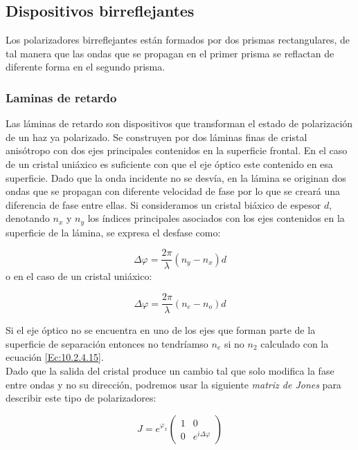 \documentclass[12pt,a4paper]{article}
\numberwithin{equation}{section}
\numberwithin{figure}{section}
\begin{document}
\subsection{Dispositivos birreflejantes}

Los polarizadores birreflejantes están formados por dos prismas rectangulares, de tal manera que las ondas que se propagan en el primer prisma se reflactan de diferente forma en el segundo prisma.

\subsubsection{Laminas de retardo}

Las láminas de retardo son dispositivos que transforman el estado de polarización de un haz ya polarizado. Se construyen por dos láminas finas de cristal anisótropo con dos ejes principales contenidos en la superficie frontal. En el caso de un cristal uniáxico es suficiente con que el eje óptico este contenido en esa superficie. Dado que la onda incidente no se desvía, en la lámina se originan dos ondas que se propagan con diferente velocidad de fase por lo que se creará una diferencia de fase entre ellas. Si consideramos un cristal biáxico de espesor $d$, denotando $n_x$ y $n_y$ los índices principales asociados con los ejes contenidos en la superficie de la lámina, se expresa el desfase como:

\begin{equation}
\Delta \varphi = \frac{2 \pi}{\lambda} (n_y - n_x) d
\end{equation}
o en el caso de un cristal uniáxico:

\begin{equation}
\Delta \varphi = \dfrac{2 \pi}{\lambda} (n_e - n_o ) d 
\end{equation}

Si el eje óptico no se encuentra en uno de los ejes que forman parte de la superficie de separación entonces no tendríamso $n_e$ si no $n_2$ calculado con la ecuación \ref{Ec:10.2.4.15}. \\

Dado que la salida del cristal produce un cambio tal que solo modifica la fase entre ondas y no su dirección, podremos usar la siguiente \textit{matriz de Jones} para describir este tipo de polarizadores:

\begin{equation}
J = e^{\varphi_x} 
\begin{pmatrix}
1 & 0 \\
0 & e^{i \Delta \varphi}
\end{pmatrix}
\end{equation}
\end{document}
